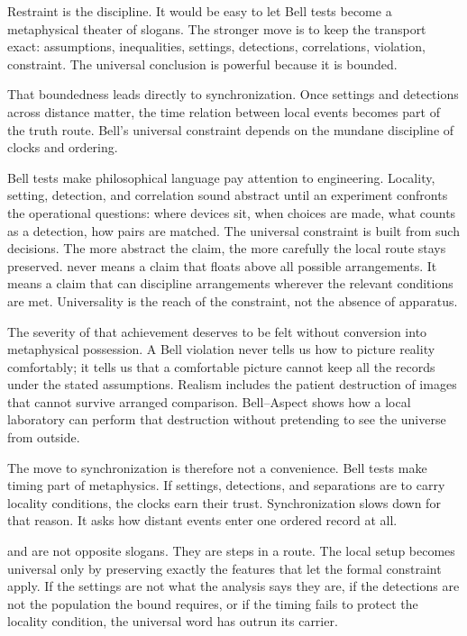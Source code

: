Restraint is the discipline. It would be easy to let Bell tests become a
metaphysical theater of slogans. The stronger move is to keep the
transport exact: assumptions, inequalities, settings, detections,
correlations, violation, constraint. The universal conclusion is powerful
because it is bounded.

That boundedness leads directly to synchronization. Once settings and
detections across distance matter, the time relation between local events
becomes part of the truth route. Bell's universal constraint depends on
the mundane discipline of clocks and ordering.

Bell tests make philosophical language pay attention to engineering.
Locality, setting, detection, and correlation sound abstract until an
experiment confronts the operational questions: where devices sit, when
choices are made, what counts as a detection, how pairs are matched. The
universal constraint is built from such decisions. The more abstract the
claim, the more carefully the local route stays preserved. 
never means a claim that floats above all possible arrangements. It means
a claim that can discipline arrangements wherever the relevant conditions
are met. Universality is the reach of the constraint, not the absence of
apparatus.

The severity of that achievement deserves to be felt without conversion
into metaphysical possession. A Bell violation never tells us how to
picture reality comfortably; it tells us that a comfortable picture
cannot keep all the records under the stated assumptions. Realism includes
the patient destruction of images that cannot survive arranged
comparison. Bell--Aspect shows how a local laboratory can perform that
destruction without pretending to see the universe from outside.

The move to synchronization is therefore not a convenience. Bell tests
make timing part of metaphysics. If settings, detections, and separations
are to carry locality conditions, the clocks earn their trust.
Synchronization slows down for that reason. It asks how distant events
enter one ordered record at all.

 and  are not opposite slogans. They are steps
in a route. The local setup becomes universal only by preserving exactly
the features that let the formal constraint apply. If the settings are
not what the analysis says they are, if the detections are not the
population the bound requires, or if the timing fails to protect the
locality condition, the universal word has outrun its carrier.

